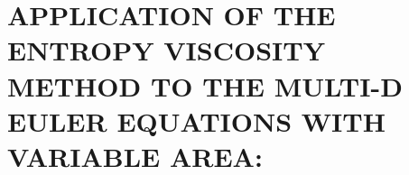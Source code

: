 %
%
%


\chapter{\uppercase {Application of the entropy viscosity method to the multi-D Euler equations with variable area:}}\label{chap:euler}
